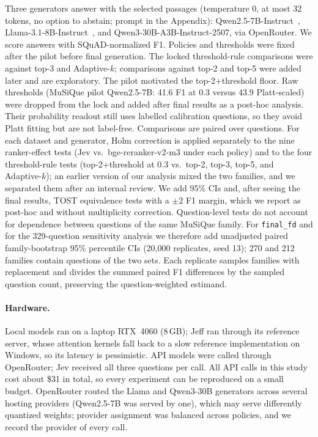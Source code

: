 Three generators answer with the selected passages (temperature 0, at most 32 tokens, no option to abstain; prompt in the Appendix): Qwen2.5-7B-Instruct~\cite{qwen25}, Llama-3.1-8B-Instruct~\cite{llama3}, and Qwen3-30B-A3B-Instruct-2507, via OpenRouter. We score answers with SQuAD-normalized F1.
Policies and thresholds were fixed after the pilot before final generation. The locked threshold-rule comparisons were against top-3 and Adaptive-$k$; comparisons against top-2 and top-5 were added later and are exploratory. The pilot motivated the top-2+threshold floor. Raw thresholds (MuSiQue pilot Qwen2.5-7B: 41.6 F1 at 0.3 versus 43.9 Platt-scaled) were dropped from the lock and added after final results as a post-hoc analysis. Their probability readout still uses labelled calibration questions, so they avoid Platt fitting but are not label-free.
Comparisons are paired over questions. For each dataset and generator, Holm correction is applied separately to the nine ranker-effect tests (Jev vs.\ bge-reranker-v2-m3 under each policy) and to the four threshold-rule tests (top-2+threshold at 0.3 vs.\ top-2, top-3, top-5, and Adaptive-$k$); an earlier version of our analysis mixed the two families, and we separated them after an internal review. We add 95\% CIs and, after seeing the final results, TOST equivalence tests with a $\pm2$ F1 margin, which we report as post-hoc and without multiplicity correction.
Question-level tests do not account for dependence between questions of the same MuSiQue family. For \texttt{final\_fd} and for the 329-question sensitivity analysis we therefore add unadjusted paired family-bootstrap 95\% percentile CIs (20,000 replicates, seed 13); 270 and 212 families contain questions of the two sets. Each replicate samples families with replacement and divides the summed paired F1 differences by the sampled question count, preserving the question-weighted estimand.

\paragraph{Hardware.}
Local models ran on a laptop RTX~4060 (8\,GB); Jeff ran through its reference server, whose attention kernels fall back to a slow reference implementation on Windows, so its latency is pessimistic.
API models were called through OpenRouter; Jev received all three questions per call. All API calls in this study cost about \$31 in total, so every experiment can be reproduced on a small budget.
OpenRouter routed the Llama and Qwen3-30B generators across several hosting providers (Qwen2.5-7B was served by one), which may serve differently quantized weights; provider assignment was balanced across policies, and we record the provider of every call.
